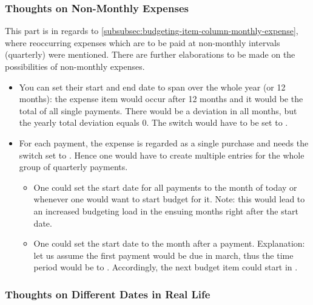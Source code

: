 \subsubsection{Thoughts on Non-Monthly Expenses}
\label{subsubsec:thoughts-non-monthly-expenses}

This part is in regards to \autoref{subsubsec:budgeting-item-column-monthly-expense}, where reoccurring expenses which are to be paid at non-monthly intervals (\eg quarterly) were mentioned.
There are further elaborations to be made on the possibilities of non-monthly expenses.
\begin{itemize}
	\item You can set their start and end date to span over the whole year (or 12 months): the expense item would occur after 12 months and it would be the total of all single payments.
	There would be a deviation in all months, but the yearly total deviation equals 0.
	The  switch would have to be set to .
	\item For each payment, \ie the expense is regarded as a single purchase and needs the  switch set to .
	Hence one would have to create multiple entries for the whole group of quarterly payments.
	\begin{itemize}
		\item One could set the start date for all payments to the month of today or whenever one would want to start budget for it.
		Note: this would lead to an increased budgeting load in the ensuing months right after the start date.
		\item One could set the start date to the month after a payment.
		Explanation: let us assume the first payment would be due in march, thus the time period would be  to .
		Accordingly, the next budget item could start in .
	\end{itemize}
\end{itemize}

\subsubsection{Thoughts on Different Dates in Real Life}
\label{subsubsec:thoughts-different-dates}

